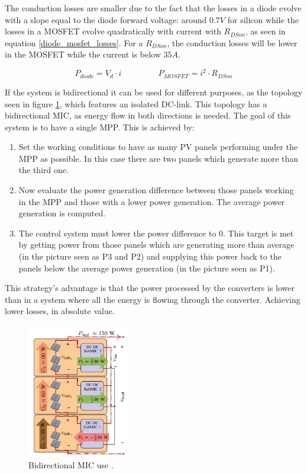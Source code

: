 The conduction losses are smaller due to the fact that the losses in a diode evolve with a slope equal to the diode forward voltage: around $0.7V$ for silicon while the losses in a MOSFET evolve quadratically with current with $R_{DSon}$, as seen in equation \ref{diode_mosfet_losses}. For a $R_{DSon}$, the conduction losses will be lower in the MOSFET while the current is below $35 A$. 

\begin{equation} \label{diode_mosfet_losses}
P_{diode} = V_d \cdot i \; \; \; \;\; \; \; \;\; \; \; \;\; \; \; \; P_{MOSFET} = i^2 \cdot R_{DSon}
\end{equation}


If the system is bidirectional it can be used for different purposes, as the topology seen in figure \ref{BID_MIC_ARCHITECTURES}, which features an isolated DC-link. This topology has a bidirectional MIC, as energy flow in both directions is needed. The goal of this system is to have a single MPP. This is achieved by:

\begin{enumerate}
	\item Set the working conditions to have as many PV  panels performing under the MPP as possible. In this case there are two panels which generate more than the third one.
	\item Now evaluate the power generation difference between those panels working in the MPP and those with a lower power generation. The average power generation is computed.
	\item The control system must lower the power difference to 0. This target is met by getting power from those panels which are generating more than average (in the picture seen as P3 and P2) and supplying this power back to the panels below the average power generation (in the picture seen as P1).
\end{enumerate}

This strategy's advantage is that the power processed by the converters is lower than in a system where all the energy is flowing through the converter. Achieving lower losses, in absolute value.

\begin{figure}[H]
	\begin{center}
		\includegraphics[width=0.4\textwidth]{../Pictures/bidirectional_mic_use}
		\caption{Bidirectional MIC use \cite{ArchitectureMIC}.}
		\label{BID_MIC_ARCHITECTURES}
	\end{center}	
\end{figure}
		
